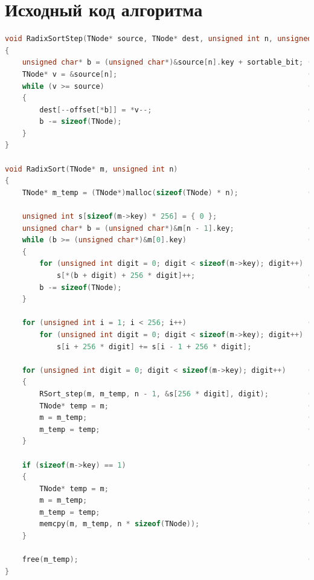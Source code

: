 \documentclass[12pt]{report}
\begin{document}
\tableofcontents

\newpage
\chapter{Исходный код алгоритма}

\begin{lstlisting}[label=some-code,caption=Функция побитовой сортировки, language=C]
void RadixSortStep(TNode* source, TNode* dest, unsigned int n, unsigned int* offset, unsigned char sortable_bit)
{
    unsigned char* b = (unsigned char*)&source[n].key + sortable_bit; (12.1)
    TNode* v = &source[n];                                            (12.2)
    while (v >= source)                                               (12.3)
    {
        dest[--offset[*b]] = *v--;                                    (12.4)
        b -= sizeof(TNode);                                           (12.5)
    }
}

void RadixSort(TNode* m, unsigned int n)                              (0)
{
    TNode* m_temp = (TNode*)malloc(sizeof(TNode) * n);                (1)

    unsigned int s[sizeof(m->key) * 256] = { 0 };                     (2)
    unsigned char* b = (unsigned char*)&m[n - 1].key;                 (3)
    while (b >= (unsigned char*)&m[0].key)                            (4)
    {
        for (unsigned int digit = 0; digit < sizeof(m->key); digit++) (5)
            s[*(b + digit) + 256 * digit]++;                          (6)
        b -= sizeof(TNode);                                           (7)
    }

    for (unsigned int i = 1; i < 256; i++)                            (8)
        for (unsigned int digit = 0; digit < sizeof(m->key); digit++) (9)
            s[i + 256 * digit] += s[i - 1 + 256 * digit];             (10)

    for (unsigned int digit = 0; digit < sizeof(m->key); digit++)     (11)
    {
        RSort_step(m, m_temp, n - 1, &s[256 * digit], digit);         (12)
        TNode* temp = m;                                              (13)
        m = m_temp;                                                   (14)
        m_temp = temp;                                                (15)
    }

    if (sizeof(m->key) == 1)                                          (16)
    {
        TNode* temp = m;                                              (17)
        m = m_temp;                                                   (18)
        m_temp = temp;                                                (19)
        memcpy(m, m_temp, n * sizeof(TNode));                         (20)
    }

    free(m_temp);                                                     (21)
}
\end{lstlisting}
\end{document}
